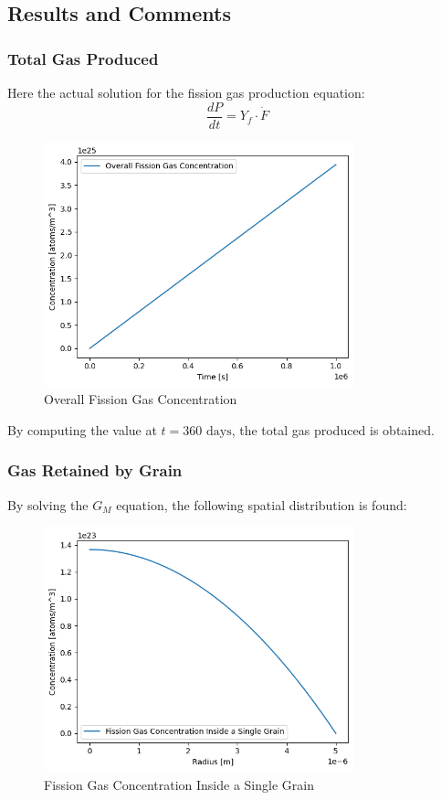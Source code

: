 \subsection{Results and Comments}

\subsubsection{Total Gas Produced}

Here the actual solution for the fission gas production equation:
\begin{equation}
    \frac{dP}{dt} = Y_f \cdot \dot{F}
\end{equation}

\begin{figure}[h!]
    \centering
    \includegraphics[width=0.8\textwidth]{FGR_1.png}
    \caption{Overall Fission Gas Concentration}
\end{figure}

By computing the value at $t = 360 \text{ days}$, the total gas produced is obtained.

\subsubsection{Gas Retained by Grain}

By solving the $G_M$ equation, the following spatial distribution is found:
\begin{figure}[h!]
    \centering
    \includegraphics[width=0.8\textwidth]{FGR_2.png}
    \caption{Fission Gas Concentration Inside a Single Grain}
\end{figure}

